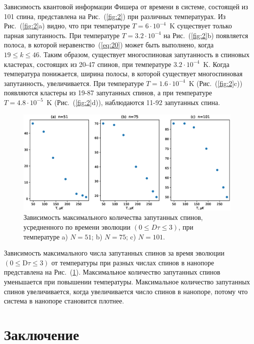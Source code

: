 \documentclass[utf8]{jetp}
\begin{document}
{ Зависимость квантовой информации Фишера от времени в системе, состоящей из 101 спина, представлена на Рис.~(\ref{fig:2}) при различных температурах.
Из Рис.~(\ref{fig:2}a) видно, что при температуре $T=6\cdot10^{-4}$~K существует только парная запутанность.
При температуре $T=3.2\cdot10^{-4}$ на Рис.~(\ref{fig:2}b) появляется полоса, в которой неравенство~(\ref{eq:20}) может быть выполнено, когда $19 \leq k \leq 46$.
Таким образом, существует многоспиновая запутанность в спиновых кластерах, состоящих из 20-47 спинов, при температуре $3.2\cdot10^{-4}$~K.
Когда температура понижается, ширина полосы, в которой существует многоспиновая запутанность, увеличивается.
При температуре $T=1.6\cdot10^{-4}$~K (Рис.~(\ref{fig:2}c)) появляются кластеры из 19-87 запутанных спинов, а при температуре $T=4.8\cdot10^{-5}$~K (Рис.~(\ref{fig:2}d)), наблюдаются 11-92 запутанных спина.

\begin{figure}
 	\includegraphics[width=0.95\linewidth]{entangled_spins_by_n.eps}
	\caption{
	  Зависимость максимального количества запутанных спинов,
	  усредненного по времени эволюции $(0 \leq D\tau \leq 3)$,
	  при температуре a) $N=51$; b) $N=75$; c) $N=101$.
	}
	\label{fig:3}
\end{figure}

Зависимость максимального числа запутанных спинов за время эволюции $({0}\leq \mathrm{D}\tau\leq{3})$ от температуры при разных числах спинов в нанопоре представлена на Рис.~(\ref{fig:3}).
Максимальное количество запутанных спинов уменьшается при повышении температуры.
Максимальное количество запутанных спинов увеличивается, когда увеличивается число спинов в нанопоре, потому что система в нанопоре становится плотнее.



\section{Заключение}
\label{sec:6}

}
\end{document}
